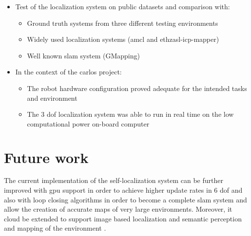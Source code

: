 \begin{itemize}
	\item Test of the localization system on public datasets and comparison with:
	\begin{itemize}
		\item Ground truth systems from three different testing environments
		\item Widely used localization systems (\gls{amcl} and ethzasl-icp-mapper)
		\item Well known \gls{slam} system (GMapping)
	\end{itemize}
 	
	\item In the context of the \gls{carlos} project:
	\begin{itemize}
		\item The robot hardware configuration proved adequate for the intended tasks and environment
		\item The 3 \gls{dof} localization system was able to run in real time on the low computational power on-board computer
	\end{itemize}
\end{itemize}



\section{Future work}
The current implementation of the self-localization system can be further improved with \gls{gpu} support in order to achieve higher update rates in 6 \gls{dof} and also with loop closing algorithms \cite{Grisetti2012,Tamaki2010} in order to become a complete \gls{slam} system and allow the creation of accurate maps of very large environments. Moreover, it cloud be extended to support image based localization \cite{Labb2014} and semantic perception and mapping of the environment \cite{Santos2013}.

